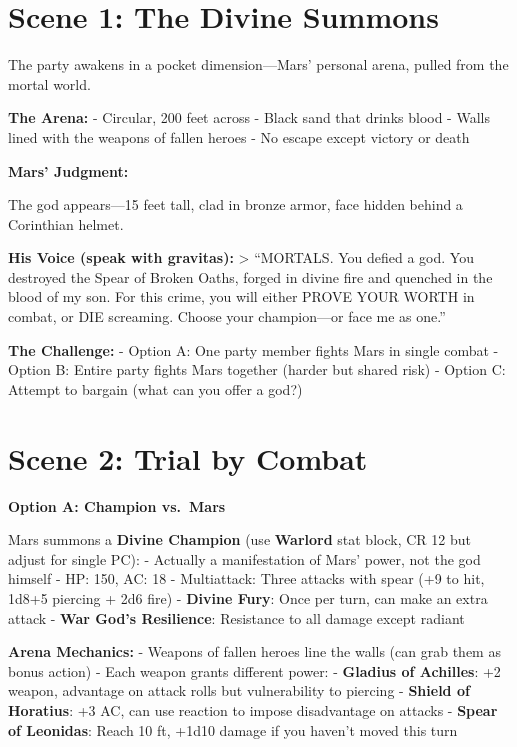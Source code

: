 \documentclass[
]{book}
\begin{document}
\section{Scene 1: The Divine Summons}\label{scene-1-the-divine-summons}

The party awakens in a pocket dimension---Mars' personal arena, pulled
from the mortal world.

\textbf{The Arena:} - Circular, 200 feet across - Black sand that drinks
blood - Walls lined with the weapons of fallen heroes - No escape except
victory or death

\textbf{Mars' Judgment:}

The god appears---15 feet tall, clad in bronze armor, face hidden behind
a Corinthian helmet.

\textbf{His Voice (speak with gravitas):} \textgreater{} ``MORTALS. You
defied a god. You destroyed the Spear of Broken Oaths, forged in divine
fire and quenched in the blood of my son. For this crime, you will
either PROVE YOUR WORTH in combat, or DIE screaming. Choose your
champion---or face me as one.''

\textbf{The Challenge:} - Option A: One party member fights Mars in
single combat - Option B: Entire party fights Mars together (harder but
shared risk) - Option C: Attempt to bargain (what can you offer a god?)

\section{Scene 2: Trial by Combat}\label{scene-2-trial-by-combat}

\textbf{Option A: Champion vs.~Mars}

Mars summons a \textbf{Divine Champion} (use \textbf{Warlord} stat
block, CR 12 but adjust for single PC): - Actually a manifestation of
Mars' power, not the god himself - HP: 150, AC: 18 - Multiattack: Three
attacks with spear (+9 to hit, 1d8+5 piercing + 2d6 fire) -
\textbf{Divine Fury}: Once per turn, can make an extra attack -
\textbf{War God's Resilience}: Resistance to all damage except radiant

\textbf{Arena Mechanics:} - Weapons of fallen heroes line the walls (can
grab them as bonus action) - Each weapon grants different power: -
\textbf{Gladius of Achilles}: +2 weapon, advantage on attack rolls but
vulnerability to piercing - \textbf{Shield of Horatius}: +3 AC, can use
reaction to impose disadvantage on attacks - \textbf{Spear of Leonidas}:
Reach 10 ft, +1d10 damage if you haven't moved this turn
\end{document}

